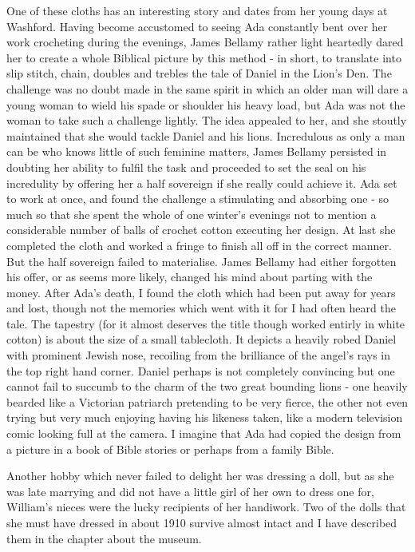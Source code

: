 One of these cloths has an interesting story and dates from her young days at Washford. Having become accustomed to seeing Ada constantly bent over her work crocheting during the evenings, James Bellamy rather light heartedly dared her to create a whole Biblical picture by this method - in short, to translate into slip stitch, chain, doubles and trebles the tale of Daniel in the Lion’s Den. The challenge was no doubt made in the same spirit in which an older man will dare a young woman to wield his spade or shoulder his heavy load, but Ada was not the woman to take such a challenge lightly. The idea appealed to her, and she stoutly maintained that she would tackle Daniel and his lions. Incredulous as only a man can be who knows little of such feminine matters, James Bellamy persisted in doubting her ability to fulfil the task and proceeded to set the seal on his incredulity by offering her a half sovereign if she really could achieve it. Ada set to work at once, and found the challenge a stimulating and absorbing one - so much so that she spent the whole of one winter's evenings not to mention a considerable number of balls of crochet cotton executing her design. At last she completed the cloth and worked a fringe to finish all off in the correct manner. But the half sovereign failed to materialise. James Bellamy had either forgotten his offer, or as seems more likely, changed his mind about parting with the money. After Ada's death, I found the cloth which had been put away for years and lost, though not the memories which went with it for I had often heard the tale. The tapestry (for it almost deserves the title though worked entirly in white cotton) is about the size of a small tablecloth. It depicts a heavily robed Daniel with prominent Jewish nose, recoiling from the brilliance of the angel's rays in the top right hand corner. Daniel perhaps is not completely convincing but one cannot fail to succumb to the charm of the two great bounding lions - one heavily bearded like a Victorian patriarch pretending to be very fierce, the other not even trying but very much enjoying having his likeness taken, like a modern television comic looking full at the camera. I imagine that Ada had copied the design from a picture in a book of Bible stories or perhaps from a family Bible.

Another hobby which never failed to delight her was dressing a doll, but as she was late marrying and did not have a little girl of her own to dress one for, William's nieces were the lucky recipients of her handiwork. Two of the dolls that she must have dressed in about 1910 survive almost intact and I have described them in the chapter about the museum.

